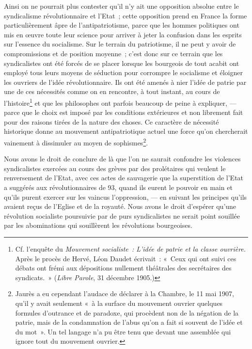 \documentclass[french,twoside]{book} %
\begin{document}
\noindent Ainsi on ne pourrait plus contester qu’il n’y ait une opposition absolue entre le syndicalisme révolutionnaire et l’Etat ; cette opposition prend en France la forme particulièrement âpre de l’antipatriotisme, parce que les hommes politiques ont mis en œuvre toute leur science pour arriver à jeter la confusion dans les esprits sur l’essence du socialisme. Sur le terrain du patriotisme, il ne peut y avoir de compromissions et de position  moyenne ; c’est donc sur ce terrain que les syndicalistes ont été forcés de se placer lorsque les bourgeois de tout acabit ont employé tous leurs moyens de séduction pour corrompre le socialisme et éloigner les ouvriers de l’idée révolutionnaire. Ils ont été amenés à nier l’idée de patrie par une de ces nécessités comme on en rencontre, à tout instant, au cours de l’histoire\footnote{ \noindent Cf. l’enquête du \emph{Mouvement socialiste : L’idée de patrie et la classe ouvrière.} Après le procès de Hervé, Léon Daudet écrivait : « Ceux qui ont suivi ces débats ont frémi aux dépositions nullement théâtrales des secrétaires des syndicats. » (\emph{Libre Parole}, 31 décembre 1905.)
 } et que les philosophes ont parfois beaucoup de peine à expliquer, — parce que le choix est imposé par les conditions extérieures et non librement fait pour des raisons tirées de la nature des choses. Ce caractère de nécessité historique donne au mouvement antipatriotique actuel une force qu’on chercherait vainement à dissimuler au moyen de sophismes\footnote{ \noindent Jaurès a eu cependant l’audace de déclarer à la Chambre, le 11 mai 1907, qu’il y avait seulement « à la surface du mouvement ouvrier quelques formules d’outrance et de paradoxe, qui procèdent non de la négation de la patrie, mais de la condamnation de l’abus qu’on a fait si souvent de l’idée et du mot ». Un tel langage n’a pu être tenu que devant une assemblée qui ignore tout du mouvement ouvrier.
 }.\par
Nous avons le droit de conclure de là que l’on ne saurait confondre les violences syndicalistes exercées au cours des grèves par des prolétaires qui veulent le renversement de l’Etat, avec ces actes de sauvagerie que la  superstition de l’Etat a suggérés aux révolutionnaires de 93, quand ils eurent le pouvoir en main et qu’ils purent exercer sur les vaincus l’oppression, — en suivant les principes qu’ils avaient reçus de l’Eglise et de la royauté. Nous avons le droit d’espérer qu’une révolution socialiste poursuivie par de purs syndicalistes ne serait point souillée par les abominations qui souillèrent les révolutions bourgeoises.
\end{document}
